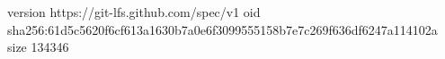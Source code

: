 version https://git-lfs.github.com/spec/v1
oid sha256:61d5c5620f6cf613a1630b7a0e6f3099555158b7e7c269f636df6247a114102a
size 134346
